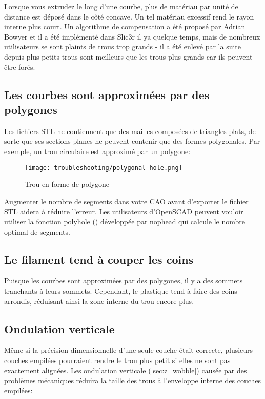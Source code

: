 Lorsque vous extrudez le long d'une courbe, plus de matériau par unité de distance est déposé dans le côté concave. Un tel matériau excessif rend le rayon interne plus court. Un algorithme de compensation a été proposé par Adrian Bowyer et il a été implémenté dans Slic3r il ya quelque temps, mais de nombreux utilisateurs se sont plaints de trous trop grands - il a été enlevé par la suite depuis plus petits trous sont meilleurs que les trous plus grands car ils peuvent être forés.

\subsection{Les courbes sont approximées par des polygones}

Les fichiers STL ne contiennent que des mailles composées de triangles plats, de sorte que ses sections planes ne peuvent contenir que des formes polygonales. Par exemple, un trou circulaire est approximé par un polygone:

\begin{figure}[H]
\centering
\texttt{[image: troubleshooting/polygonal-hole.png]}
\caption{Trou en forme de polygone}
\label{fig:polygonal-hole}
\end{figure}
Augmenter le nombre de segments dans votre CAO avant d'exporter le fichier STL aidera à réduire l'erreur. Les utilisateurs d'OpenSCAD peuvent vouloir utiliser la fonction polyhole () développée par nophead qui calcule le nombre optimal de segments.

\subsection{Le filament tend à couper les coins}

Puisque les courbes sont approximées par des polygones, il y a des sommets tranchants à leurs sommets. Cependant, le plastique tend à faire des coins arrondis, réduisant ainsi la zone interne du trou encore plus.

\subsection{Ondulation verticale}

Même si la précision dimensionnelle d'une seule couche était correcte, plusieurs couches empilées pourraient rendre le trou plus petit si elles ne sont pas exactement alignées. Les ondulation verticale (\ref{sec:z_wobble}) causée par des problèmes mécaniques réduira la taille des trous à l'enveloppe interne des couches empilées:

